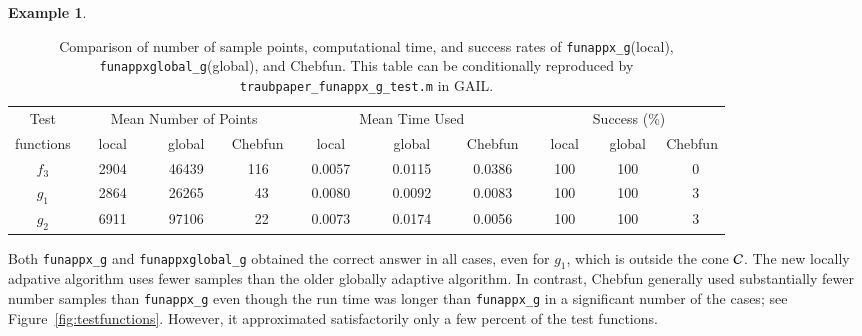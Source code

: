 \documentclass[review]{elsarticle}
\theoremstyle{definition}
\newtheorem{exmp}{Example}
\newcommand{\funappxg}{\texttt{funappx\_g}\xspace}
\newcommand{\funappxglobalg}{\texttt{funappxglobal\_g}\xspace}
\begin{document}
\begin{exmp}
%
\begin{table}[bt]
\centering
\caption{Comparison of number of sample points, computational time,  and success
rates of \funappxg (local), \funappxglobalg (global), and Chebfun.
This table can be conditionally reproduced by
\texttt{traubpaper\_funappx\_g\_test.m} in GAIL.}
\label{tab:localVsGlobalVsChebfun}
{\footnotesize
\setlength{\tabcolsep}{.3em} %
		\begin{tabular}{ccrccrccrccrccrccrccrccrccrc}		
			Test      &    \multicolumn{9}{c}{Mean Number of Points}   & \multicolumn{9}{c}{Mean Time Used}  & \multicolumn{9}{c}{Success (\%)}
			\\  functions &  \multicolumn{3}{c}{local}  &  \multicolumn{3}{c}{global }  &  \multicolumn{3}{c}{Chebfun }  & \multicolumn{3}{c}{local}  &  \multicolumn{3}{c}{global }  &  \multicolumn{3}{c}{Chebfun } & \multicolumn{3}{c}{local}  &  \multicolumn{3}{c}{global }  &  \multicolumn{3}{c}{Chebfun } 
\\ \toprule
          $f_3$   &&   2904  &&&   46439   &&&   116    &&&   0.0057   &&&     0.0115    &&&   0.0386 &&&    100   &&&  100   &&&  0  
\\        $g_1$   &&   2864  &&&   26265   &&&    43    &&&   0.0080   &&&     0.0092    &&&   0.0083 &&&    100   &&&  100   &&&  3  
\\        $g_2$   &&   6911  &&&   97106   &&&    22    &&&   0.0073   &&&     0.0174    &&&   0.0056 &&&    100   &&&  100    &&&  3  	
\end{tabular}
}
\end{table}
%

Both \funappxg{} and \funappxglobalg{} obtained the correct answer in all cases,
even for $g_1$, which is outside the cone $\mathcal{C}$. The new locally adpative
algorithm uses fewer samples than the older globally adaptive algorithm. In
contrast, Chebfun generally used substantially fewer number samples than
\funappxg{} even though the run time was longer than \funappxg{} in a
significant number of the cases; see Figure~\ref{fig:testfunctions}. However, it
approximated satisfactorily only a few percent of the test functions.



\end{exmp}
\end{document}
